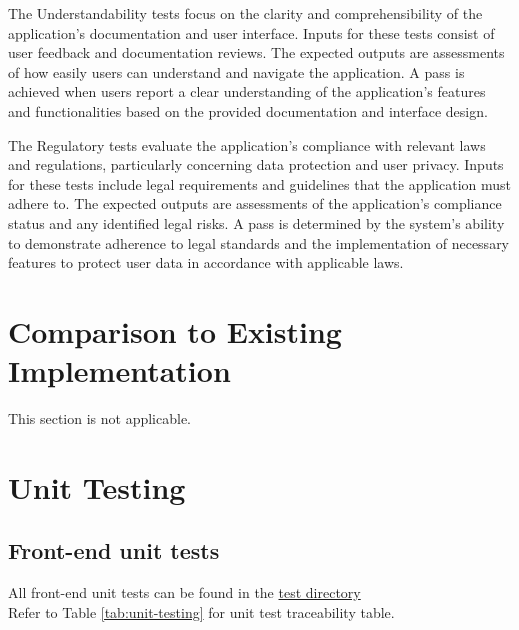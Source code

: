 \documentclass[12pt, titlepage]{article}
\begin{document}
The Understandability tests focus on the clarity and comprehensibility of the 
application's documentation and user interface. Inputs for these tests consist 
of user feedback and documentation reviews. The expected outputs are assessments 
of how easily users can understand and navigate the application. A pass is achieved 
when users report a clear understanding of the application’s features and 
functionalities based on the provided documentation and interface design.

The Regulatory tests evaluate the application's compliance with relevant laws 
and regulations, particularly concerning data protection and user privacy. 
Inputs for these tests include legal requirements and guidelines that the application 
must adhere to. The expected outputs are assessments of the application's compliance 
status and any identified legal risks. A pass is determined by the system's 
ability to demonstrate adherence to legal standards and the implementation 
of necessary features to protect user data in accordance with applicable laws.


\section{Comparison to Existing Implementation}	

This section is not applicable.

\section{Unit Testing}

\subsection{Front-end unit tests}

All front-end unit tests can be found in the \href{https://github.com/PlutosCapstone/Plutos/tree/main/src/client/tests}{test directory}\\
Refer to Table \ref{tab:unit-testing} for unit test traceability table.
\end{document}
